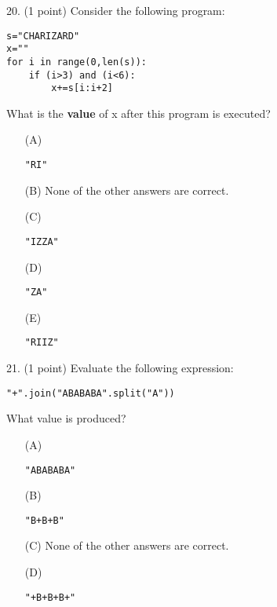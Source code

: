 \documentclass{article}
\begin{document}
\noindent
\begin{minipage}{\textwidth}
20. (1 point)
Consider the following program:
\begin{verbatim}
s="CHARIZARD"
x=""
for i in range(0,len(s)):
    if (i>3) and (i<6):
        x+=s[i:i+2]
\end{verbatim}
What is the \textbf{value} of x after this program is executed?

\begin{enumerate}
\item[(A)]
\begin{verbatim}"RI"\end{verbatim}

\item[(B)]
None of the other answers are correct.

\item[(C)]
\begin{verbatim}"IZZA"\end{verbatim}

\item[(D)]
\begin{verbatim}"ZA"\end{verbatim}

\item[(E)]
\begin{verbatim}"RIIZ"\end{verbatim}

\end{enumerate}
\end{minipage}
\vspace{10em}
\filbreak\vfil{}\vfilneg

\noindent
\begin{minipage}{\textwidth}
21. (1 point)
Evaluate the following expression:
\begin{verbatim}
"+".join("ABABABA".split("A"))
\end{verbatim}
What value is produced?

\begin{enumerate}
\item[(A)]
\begin{verbatim}"ABABABA"\end{verbatim}

\item[(B)]
\begin{verbatim}"B+B+B"\end{verbatim}

\item[(C)]
None of the other answers are correct.

\item[(D)]
\begin{verbatim}"+B+B+B+"\end{verbatim}

\end{enumerate}
\end{minipage}
\vspace{10em}
\filbreak\vfil{}\vfilneg
\end{document}

